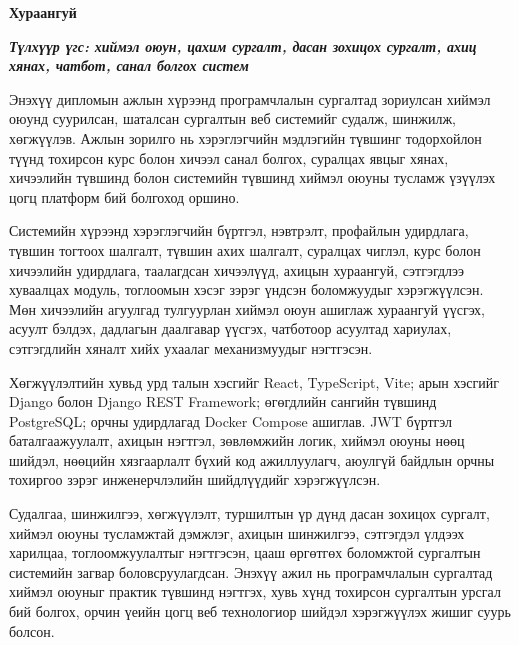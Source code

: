 

\begin{center}
{\scshape\Large \univname\par}
{\scshape\large \facname\par}\vspace{0.5cm}
{\huge\textbf{{Хураангуй}} \par}
\bigskip
{\Large{\ttitle} \par}
\bigskip

{\normalsize \shortname \par}
\addressname
\end{center}

\textit{\textbf{Түлхүүр үгс: хиймэл оюун, цахим сургалт, дасан зохицох сургалт, ахиц хянах, чатбот, санал болгох систем}}
\bigskip

Энэхүү дипломын ажлын хүрээнд програмчлалын сургалтад зориулсан хиймэл оюунд суурилсан, шаталсан сургалтын веб системийг судалж, шинжилж, хөгжүүлэв. Ажлын зорилго нь хэрэглэгчийн мэдлэгийн түвшинг тодорхойлон түүнд тохирсон курс болон хичээл санал болгох, суралцах явцыг хянах, хичээлийн түвшинд болон системийн түвшинд хиймэл оюуны тусламж үзүүлэх цогц платформ бий болгоход оршино.

Системийн хүрээнд хэрэглэгчийн бүртгэл, нэвтрэлт, профайлын удирдлага, түвшин тогтоох шалгалт, түвшин ахих шалгалт, суралцах чиглэл, курс болон хичээлийн удирдлага, таалагдсан хичээлүүд, ахицын хураангуй, сэтгэгдлээ хуваалцах модуль, тоглоомын хэсэг зэрэг үндсэн боломжуудыг хэрэгжүүлсэн. Мөн хичээлийн агуулгад тулгуурлан хиймэл оюун ашиглаж хураангуй үүсгэх, асуулт бэлдэх, дадлагын даалгавар үүсгэх, чатботоор асуултад хариулах, сэтгэгдлийн хяналт хийх ухаалаг механизмуудыг нэгтгэсэн.

Хөгжүүлэлтийн хувьд урд талын хэсгийг React, TypeScript, Vite; арын хэсгийг Django болон Django REST Framework; өгөгдлийн сангийн түвшинд PostgreSQL; орчны удирдлагад Docker Compose ашиглав. JWT бүртгэл баталгаажуулалт, ахицын нэгтгэл, зөвлөмжийн логик, хиймэл оюуны нөөц шийдэл, нөөцийн хязгаарлалт бүхий код ажиллуулагч, аюулгүй байдлын орчны тохиргоо зэрэг инженерчлэлийн шийдлүүдийг хэрэгжүүлсэн.

Судалгаа, шинжилгээ, хөгжүүлэлт, туршилтын үр дүнд дасан зохицох сургалт, хиймэл оюуны тусламжтай дэмжлэг, ахицын шинжилгээ, сэтгэгдэл үлдээх харилцаа, тоглоомжуулалтыг нэгтгэсэн, цааш өргөтгөх боломжтой сургалтын системийн загвар боловсруулагдсан. Энэхүү ажил нь програмчлалын сургалтад хиймэл оюуныг практик түвшинд нэгтгэх, хувь хүнд тохирсон сургалтын урсгал бий болгох, орчин үеийн цогц веб технологиор шийдэл хэрэгжүүлэх жишиг суурь болсон.
